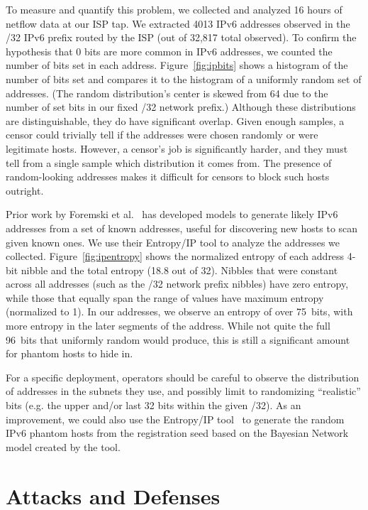 \documentclass[sigconf]{acmart}
\begin{document}
To measure and quantify this problem, we collected and analyzed 16 hours of
netflow data at our ISP tap. We extracted 4013 IPv6 addresses observed in the /32
IPv6 prefix routed by the ISP (out of 32,817 total observed). To confirm the
hypothesis that 0 bits are more common in IPv6 addresses, we counted the number
of bits set in each address. Figure~\ref{fig:ipbits} shows a histogram of the
number of bits set and compares it to the histogram of a uniformly random set of
addresses. (The random distribution's center is skewed from 64 due to
the number of set bits in our fixed /32 network prefix.) Although these
distributions are distinguishable, they do have significant overlap. Given
enough samples, a censor could trivially tell if the addresses were chosen
randomly or were legitimate hosts. However, a censor's job is significantly
harder, and they must tell from a single sample which distribution it comes
from. The presence of random-looking addresses makes it difficult for censors to
block such hosts outright.


Prior work by Foremski et al.~\cite{foremski2016entropy} has developed models to
generate likely IPv6 addresses from a set of known addresses, useful for
discovering new hosts to scan given known ones. We use their Entropy/IP tool to
analyze the addresses we collected. Figure~\ref{fig:ipentropy} shows the
normalized entropy of each address 4-bit nibble and the total entropy (18.8 out
of 32). Nibbles that were constant across all addresses
(such as the /32 network prefix nibbles) have zero entropy, while those that
equally span the range of values have maximum entropy (normalized to 1). In our
addresses, we observe an entropy of over 75~bits, with more entropy in the later
segments of the address. While not quite the full 96~bits that uniformly random
would produce, this is still a significant amount for phantom hosts to hide in.

For a specific deployment, operators should be careful to observe the distribution of
addresses in the subnets they use, and possibly limit to randomizing ``realistic''
bits (e.g. the upper and/or last 32 bits within the given /32).
As an improvement, we could also use the Entropy/IP
tool~\cite{foremski2016entropy} to generate the random IPv6 phantom hosts from
the registration seed based on the Bayesian Network model created by the tool.



\section{Attacks and Defenses}
\label{sec:attacks}
\end{document}
